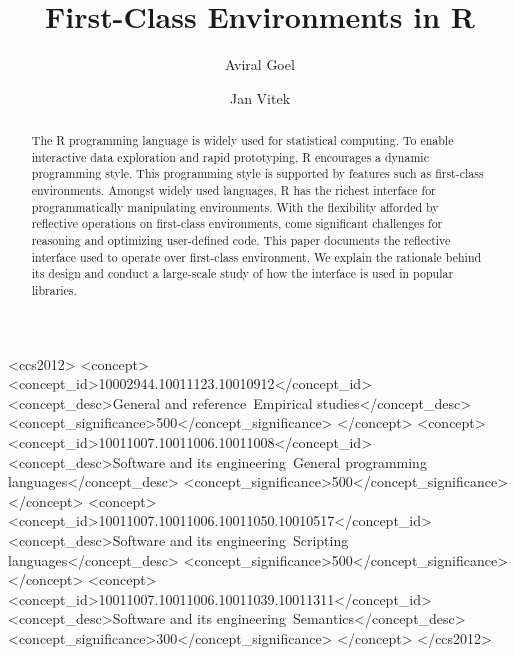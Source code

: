 \documentclass[10pt,sigplan,authorversion=true]{acmart}
\begin{document}
\title{First-Class Environments in R}
\author{Aviral Goel}
\author{Jan Vitek}
\authorsaddresses{}
\renewcommand{\shortauthors}{Goel, Vitek}


\begin{abstract}
  The R programming language is widely used for statistical computing. To enable
  interactive data exploration and rapid prototyping, R encourages a dynamic
  programming style. This programming style is supported by features such as
  first-class environments. Amongst widely used languages, R has the richest
  interface for programmatically manipulating environments. With the flexibility
  afforded by reflective operations on first-class environments, come
  significant challenges for reasoning and optimizing user-defined code. This
  paper documents the reflective interface used to operate over first-class
  environment. We explain the rationale behind its design and conduct a
  large-scale study of how the interface is used in popular libraries.
\end{abstract}

\begin{CCSXML}
<ccs2012>
<concept>
<concept_id>10002944.10011123.10010912</concept_id>
<concept_desc>General and reference~Empirical studies</concept_desc>
<concept_significance>500</concept_significance>
</concept>
<concept>
<concept_id>10011007.10011006.10011008</concept_id>
<concept_desc>Software and its engineering~General programming languages</concept_desc>
<concept_significance>500</concept_significance>
</concept>
<concept>
<concept_id>10011007.10011006.10011050.10010517</concept_id>
<concept_desc>Software and its engineering~Scripting languages</concept_desc>
<concept_significance>500</concept_significance>
</concept>
<concept>
<concept_id>10011007.10011006.10011039.10011311</concept_id>
<concept_desc>Software and its engineering~Semantics</concept_desc>
<concept_significance>300</concept_significance>
</concept>
</ccs2012>
\end{CCSXML}


\end{document}
